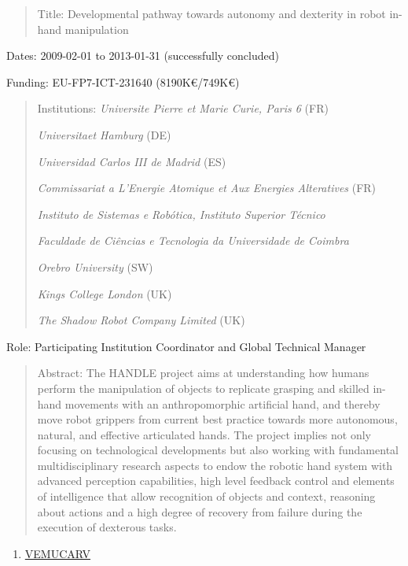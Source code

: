 \documentclass[
]{article}
\begin{document}
\begin{quote}
Title: Developmental pathway towards autonomy and dexterity in robot
in-hand manipulation
\end{quote}

Dates: 2009-02-01 to 2013-01-31 (successfully concluded)

Funding: EU-FP7-ICT-231640 (8190K€/749K€)

\begin{quote}
Institutions: \emph{Universite Pierre et Marie Curie, Paris 6} (FR)

\emph{Universitaet Hamburg} (DE)

\emph{Universidad Carlos III de Madrid} (ES)

\emph{Commissariat a L'Energie Atomique et Aux Energies Alteratives}
(FR)

\emph{Instituto de Sistemas e Robótica, Instituto Superior Técnico}

\emph{Faculdade de Ciências e Tecnologia da Universidade de Coimbra}

\emph{Orebro University} (SW)

\emph{Kings College London} (UK)

\emph{The Shadow Robot Company Limited} (UK)
\end{quote}

Role: Participating Institution Coordinator and Global Technical Manager

\begin{quote}
Abstract: The HANDLE project aims at understanding how humans perform
the manipulation of objects to replicate grasping and skilled in-hand
movements with an anthropomorphic artificial hand, and thereby move
robot grippers from current best practice towards more autonomous,
natural, and effective articulated hands. The project implies not only
focusing on technological developments but also working with fundamental
multidisciplinary research aspects to endow the robotic hand system with
advanced perception capabilities, high level feedback control and
elements of intelligence that allow recognition of objects and context,
reasoning about actions and a high degree of recovery from failure
during the execution of dexterous tasks.
\end{quote}

\begin{enumerate}
\def\labelenumi{\arabic{enumi}.}
\setcounter{enumi}{7}
\item
  \ul{VEMUCARV}
\end{enumerate}
\end{document}
